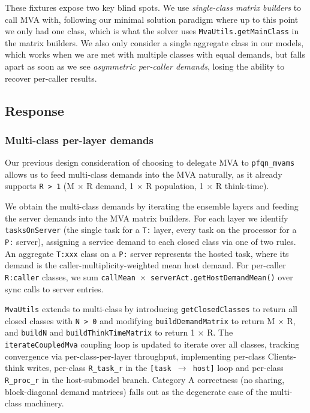 These fixtures expose two key blind spots. We use \textit{single-class matrix builders} to call MVA with, following our minimal solution paradigm where up to this point we only had one class, which is what the solver uses \texttt{MvaUtils.getMainClass} in the matrix builders. We also only consider a single aggregate class in our models, which works when we are met with multiple classes with equal demands, but falls apart as soon as we see \textit{asymmetric per-caller demands}, losing the ability to recover per-caller results.

\subsection{Response}


\subsubsection*{Multi-class per-layer demands}

Our previous design consideration of choosing to delegate MVA to \texttt{pfqn\_mvams} allows us to feed multi-class demands into the MVA naturally, as it already supports \texttt{R > 1} (M $\times$ R demand, 1 $\times$ R population, 1 $\times$ R think-time).

We obtain the multi-class demands by iterating the ensemble layers and feeding the server demands into the MVA matrix builders. For each layer we identify \texttt{tasksOnServer} (the single task for a \texttt{T:} layer, every task on the processor for a \texttt{P:} server), assigning a service demand to each closed class via one of two rules. An aggregate \texttt{T:xxx} class on a \texttt{P:} server represents the hosted task, where its demand is the caller-multiplicity-weighted mean host demand. For per-caller \texttt{R:caller} classes, we sum \texttt{callMean $\times$ serverAct.getHostDemandMean()} over sync calls to server entries.

\texttt{MvaUtils} extends to multi-class by introducing \texttt{getClosedClasses} to return all closed classes with \texttt{N > 0} and modifying \texttt{buildDemandMatrix} to return M $\times$ R, and \texttt{buildN} and \texttt{buildThinkTimeMatrix} to return 1 $\times$ R. The \texttt{iterateCoupledMva} coupling loop is updated to iterate over all classes, tracking convergence via per-class-per-layer throughput, implementing per-class Clients-think writes, per-class \texttt{R\_task\_r} in the \texttt{[task $\rightarrow$ host]} loop and per-class \texttt{R\_proc\_r} in the host-submodel branch. Category A correctness (no sharing, block-diagonal demand matrices) falls out as the degenerate case of the multi-class machinery.


